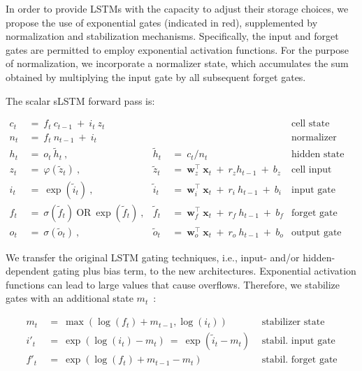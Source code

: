 In order to provide LSTMs with the capacity to adjust their storage choices, we propose the use of exponential gates (indicated in red), supplemented by normalization and stabilization mechanisms. Specifically, the input and forget gates are permitted to employ exponential activation functions. For the purpose of normalization, we incorporate a normalizer state, which accumulates the sum obtained by multiplying the input gate by all subsequent forget gates.

The scalar sLSTM forward pass is:

\begin{align}
\label{eq:slstmforward}
c_t \ &= \  f_t \ c_{t-1} \ + \ i_t \ z_t & & 
 &\text{cell state} \\
n_t \ &= \  f_t \ n_{t-1} \ + \ i_t  & & 
 &\text{normalizer state} \\
h_t \ &= \ o_t \ \tilde{h}_t \ ,
  &\tilde{h}_t \ &= \ c_t / n_t
&\text{hidden state} \\
z_t \ &= \ \varphi \left( \tilde{z}_t \right) \ , 
  &\tilde{z}_t \ &=  \ \mathbf{w}^\top_{z} \ \mathbf{x}_t \ + \
  r_{z}  h_{t-1} \ + \  b_{z}
  &\text{cell input} \\
i_t \ &= \ \!\exp \left( \tilde{i}_t  \right) \ , 
  &\tilde{i}_t \ &= \ \mathbf{w}^\top_{i} \ \mathbf{x}_t \ + \
  r_{i}  \ h_{t-1} \ + \  b_{i}
  &\text{input gate} \\
f_t \ &= \ \sigma \left(  \tilde{f}_t \right) \ \text{OR} \
\!\exp \left(  \tilde{f}_t \right) \ ,
  &\tilde{f}_t \ &= \ \mathbf{w}^\top_{f} \ \mathbf{x}_t  \ + \
  r_{f}  \ h_{t-1} \ + \  b_{f}
  &\text{forget gate} \\
o_t \ &= \ \sigma \left( \tilde{o}_t \right) \ , 
  &\tilde{o}_t  \ &= \ \mathbf{w}^\top_{o} \ \mathbf{x}_t \ + \
  r_{o}  \ h_{t-1} \ + \  b_{o}
  &\text{output gate} 
\end{align}

We transfer the original LSTM gating techniques, i.e., input- and/or hidden-dependent gating plus bias term, to the new architectures. Exponential activation functions can lead to large values that cause overflows. Therefore, we stabilize gates with an additional state \mbox{$m_t$~\citep{Milakov:18arxiv}}:

\begin{align}
\label{eq:slstmstabil}
m_t \ &= \ \max \left( \log ( f_t ) + m_{t-1} , \log ( i_t ) \right) &\text{stabilizer state} \\
i'_t \ &= \ \!\exp \left( \log \left ( i_t \right) - m_t \right) \ = \ \!\exp \left( \tilde{i}_t - m_t \right) \ \, 
  &\text{stabil. input gate} \\
f'_t \ &= \ \!\exp \left( \log \left( f_t \right) + m_{t-1} - m_t \right) \ \, 
  &\text{stabil. forget gate}
\end{align}

